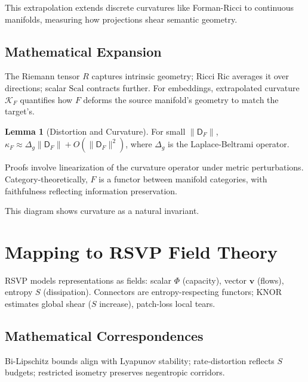 \documentclass{article}
\theoremstyle{definition}
\newtheorem{lemma}[theorem]{Lemma}
\begin{document}
This extrapolation extends discrete curvatures like Forman-Ricci \citep{forman2003bochner} to continuous manifolds, measuring how projections shear semantic geometry.

\subsection{Mathematical Expansion}

The Riemann tensor $R$ captures intrinsic geometry; Ricci $\mathrm{Ric}$ averages it over directions; scalar $\mathrm{Scal}$ contracts further. For embeddings, extrapolated curvature $\mathcal{K}_F$ quantifies how $F$ deforms the source manifold's geometry to match the target's.

\begin{lemma}[Distortion and Curvature]
For small $\|\mathsf{D}_F\|$, $\kappa_F \approx \Delta_g \|\mathsf{D}_F\| + O(\|\mathsf{D}_F\|^2)$, where $\Delta_g$ is the Laplace-Beltrami operator.
\end{lemma}

Proofs involve linearization of the curvature operator under metric perturbations. Category-theoretically, $F$ is a functor between manifold categories, with faithfulness reflecting information preservation.


This diagram shows curvature as a natural invariant.

\section{Mapping to RSVP Field Theory}

RSVP models representations as fields: scalar $\Phi$ (capacity), vector $\mathbf{v}$ (flows), entropy $S$ (dissipation). Connectors are entropy-respecting functors; KNOR estimates global shear ($S$ increase), patch-loss local tears.

\subsection{Mathematical Correspondences}

Bi-Lipschitz bounds align with Lyapunov stability; rate-distortion reflects $S$ budgets; restricted isometry preserves negentropic corridors.
\end{document}
